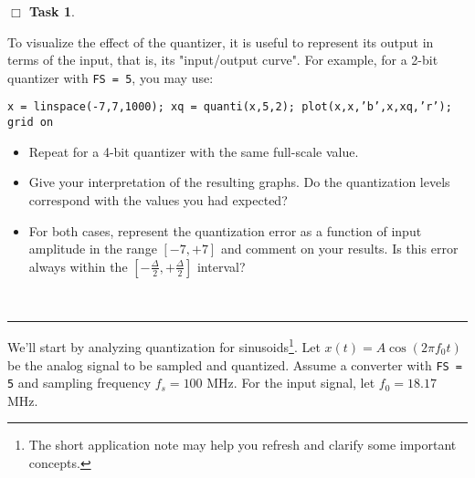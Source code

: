 \documentclass[11pt]{article}
\newcounter{ntask}
\newtheorem{task}[ntask]{$\Box$ Task}
\newenvironment{Task}
{\begin{task}\end{task} \vspace{-0.1in}\sf}
{\hfill \QED}
\def\QED{~\rule[-1pt]{5pt}{5pt}\par\medskip}
\begin{document}
\begin{Task}

To visualize the effect of the quantizer, it is useful to represent its output in terms of the input, that is, its "input/output curve". For example, for a 2-bit quantizer with {\tt FS = 5},  you may use:
\begin{center}
{\tt x = linspace(-7,7,1000); xq = quanti(x,5,2); plot(x,x,'b',x,xq,'r'); grid on}
\end{center}

\begin{itemize}
\item Repeat for a 4-bit quantizer with the same full-scale value.
\item Give your interpretation of the resulting graphs. Do the quantization levels correspond with the values you had expected?

\item For both cases, represent the quantization error as a function of input amplitude in the range $[-7,+7]$ and comment on your results. Is this error always within the $[-\frac{\Delta}{2}, +\frac{\Delta}{2}]$ interval?
\end{itemize}
\vspace*{-0.5cm}
\end{Task}

\newpage

We'll start by analyzing quantization for sinusoids\footnote{The short application note \cite{K1} may help you refresh and clarify some important concepts.}.
Let $x(t) = A\cos(2\pi f_0 t)$ be the analog signal to be sampled and quantized. Assume a converter with {\tt FS = 5} and sampling frequency $f_s = 100$ MHz. For the input signal, 
let $f_0 = 18.17$ MHz. 
\end{document}

